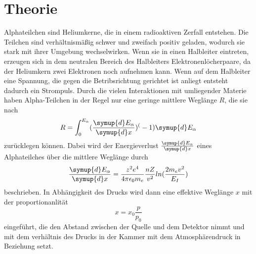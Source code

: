 \section{Theorie}
\label{sec:Theorie}

Alphateilchen sind Heliumkerne, die in einem radioaktiven Zerfall entstehen. Die Teilchen sind verhältnismäßig
schwer und zweifach positiv geladen, wodurch sie stark mit ihrer Umgebung wechselwirken. Wenn sie in einen
Halbleiter eintreten, erzeugen sich in dem neutralen Bereich des Halbleiters Elektronenlöcherpaare, da der Heliumkern
zwei Elektronen noch aufnehmen kann. Wenn auf dem Halbleiter eine Spannung, die gegen die Betribsrichtung gerichtet ist anliegt
entsteht dadurch ein Strompuls. Durch die vielen Interaktionen mit umliegender Materie haben Alpha-Teilchen in der Regel
nur eine geringe mittlere Weglänge $R$, die sie nach
\begin{equation}
    R=\int_0^{E_\alpha}(\frac{\symup{d}E_\alpha}{\symup{d}x})^(-1)\symup{d}E_\alpha  
    \label{eqn:Weglänge}
\end{equation}
\noindent zurücklegen können. Dabei wird der Energieverlust $\frac{\symup{d}E_\alpha}{\symup{d}x}$ eines Alphateilches
über die mittlere Weglänge durch
\begin{equation}
    \frac{\symup{d}E_\alpha}{\symup{d}x}=\frac{z^2 e^4}{4\pi \epsilon_0 m_e}\frac{nZ}{v^2}ln(\frac{2m_ev^2}{E_I})
    \label{eqn:bethe}
\end{equation}
\noindent beschrieben.
In Abhängigkeit des Drucks wird dann eine effektive Weglänge $x$ mit der proportionanlität
\begin{equation}
    x=x_0\frac{p}{p_0}
    \label{eqn:druck}
\end{equation}
eingeführt, die den Abstand zwischen der Quelle und dem Detektor nimmt und mit dem verhältnis des Drucks in der Kammer
mit dem Atmosphärendruck in Beziehung setzt.
\cite{sample}
